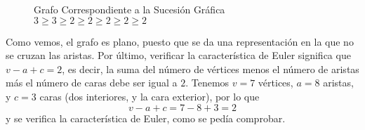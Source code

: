 \documentclass[12pt]{article}
\begin{document}
\begin{ejercicio}
        \begin{figure}[H]
            \centering
            \caption{Grafo Correspondiente a la Sucesión Gráfica $3 \ge 3 \ge 2 \ge 2 \ge 2 \ge 2 \ge 2$}
            \label{fig:ej1}
        \end{figure}

        Como vemos, el grafo es plano, puesto que se da una representación en la que no se cruzan las aristas. Por último, verificar la característica de Euler significa que $v - a + c = 2$, es decir, la suma del número de vértices menos el número de aristas más el número de caras debe ser igual a $2$.
        Tenemos $v=7$ vértices, $a = 8$ aristas, y $c=3$ caras (dos interiores, y la cara exterior), por lo que $$v - a + c = 7 - 8 + 3 = 2$$ y se verifica la característica de Euler, como se pedía comprobar.
    \end{ejercicio}
\end{document}
